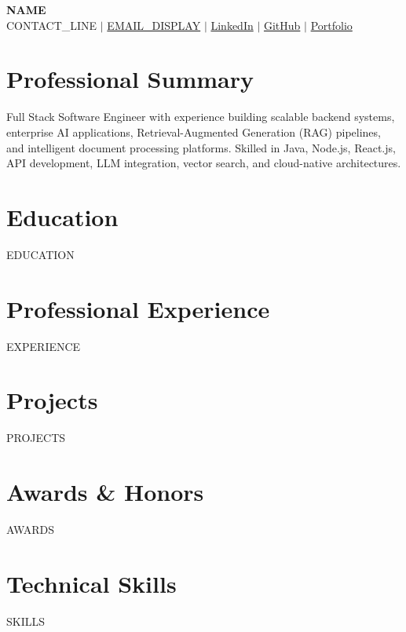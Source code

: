 \documentclass[letterpaper,11pt]{article}
\newcommand{\resumeSubHeadingListStart}{\begin{itemize}[leftmargin=0.15in, label={}]}
\newcommand{\resumeSubHeadingListEnd}{\end{itemize}}
\begin{document}
\begin{center}
    \textbf{\Huge \scshape {{NAME}}} \\ \vspace{1pt}
    \small  {{CONTACT_LINE}} $|$ 
    \href{{{EMAIL_URL}}}{{{EMAIL_DISPLAY}}} $|$
    \href{{{LINKEDIN_URL}}}{LinkedIn} $|$ 
    \href{{{GITHUB_URL}}}{GitHub} $|$ 
    \href{https://portfolio-new-five-ivory.vercel.app/}{Portfolio}
\end{center}

\section{Professional Summary}
\small{
Full Stack Software Engineer with experience building scalable backend systems, enterprise AI applications, Retrieval-Augmented Generation (RAG) pipelines, and intelligent document processing platforms. Skilled in Java, Node.js, React.js, API development, LLM integration, vector search, and cloud-native architectures.
}

\section{Education}
\resumeSubHeadingListStart
{{EDUCATION}}
\resumeSubHeadingListEnd

\section{Professional Experience}
\resumeSubHeadingListStart
{{EXPERIENCE}}
\resumeSubHeadingListEnd

\section{Projects}
\resumeSubHeadingListStart
{{PROJECTS}}
\resumeSubHeadingListEnd

\section{Awards \& Honors}
\resumeSubHeadingListStart
{{AWARDS}}
\resumeSubHeadingListEnd

\section{Technical Skills}
\begin{itemize}[leftmargin=0.15in, label={}]\small{\item{
{{SKILLS}}
}}
\end{itemize}
\end{document}
